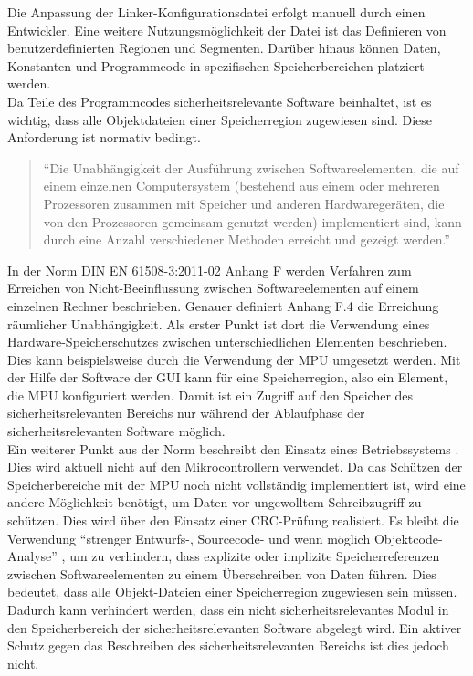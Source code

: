 Die Anpassung der Linker-Konfigurationsdatei erfolgt manuell durch einen Entwickler.
Eine weitere Nutzungsmöglichkeit der Datei ist das Definieren von benutzerdefinierten Regionen und Segmenten.
Darüber hinaus können Daten, Konstanten und Programmcode in spezifischen Speicherbereichen platziert werden. \\

Da Teile des Programmcodes sicherheitsrelevante Software beinhaltet, ist es wichtig, dass alle Objektdateien einer Speicherregion zugewiesen sind.
Diese Anforderung ist normativ bedingt.
\begin{quote}
	\enquote{Die Unabhängigkeit der Ausführung zwischen Softwareelementen, die auf einem einzelnen Computersystem (bestehend aus einem oder mehreren Prozessoren zusammen mit Speicher und anderen Hardwaregeräten, die von den Prozessoren gemeinsam genutzt werden) implementiert sind, kann durch eine Anzahl verschiedener Methoden erreicht und gezeigt werden.} \cite{FunkSicher}
\end{quote}
In der Norm DIN EN 61508-3:2011-02 Anhang F werden Verfahren zum Erreichen von Nicht-Beeinflussung zwischen Softwareelementen auf einem einzelnen Rechner beschrieben.
Genauer definiert Anhang F.4 die Erreichung räumlicher Unabhängigkeit.
Als erster Punkt ist dort die Verwendung eines Hardware-Speicherschutzes zwischen unterschiedlichen Elementen beschrieben.
Dies kann beispielsweise durch die Verwendung der \ac{MPU} umgesetzt werden.
Mit der Hilfe der Software der \ac{GUI} kann für eine Speicherregion, also ein Element, die \ac{MPU} konfiguriert werden.
Damit ist ein Zugriff auf den Speicher des sicherheitsrelevanten Bereichs nur während der Ablaufphase der sicherheitsrelevanten Software möglich. \\

Ein weiterer Punkt aus der Norm beschreibt den Einsatz eines Betriebssystems \cite{FunkSicher}.
Dies wird aktuell nicht auf den Mikrocontrollern verwendet.
Da das Schützen der Speicherbereiche mit der \ac{MPU} noch nicht vollständig implementiert ist, wird eine andere Möglichkeit benötigt, um Daten vor ungewolltem Schreibzugriff zu schützen. 
Dies wird über den Einsatz einer \ac{CRC}-Prüfung realisiert.
Es bleibt die Verwendung \enquote{strenger Entwurfs-, Sourcecode- und wenn möglich Objektcode-Analyse} \cite{FunkSicher}, um zu verhindern, dass explizite oder implizite Speicherreferenzen zwischen Softwareelementen zu einem Überschreiben von Daten führen. 
Dies bedeutet, dass alle Objekt-Dateien einer Speicherregion zugewiesen sein müssen.
Dadurch kann verhindert werden, dass ein nicht sicherheitsrelevantes Modul in den Speicherbereich der sicherheitsrelevanten Software abgelegt wird. 
Ein aktiver Schutz gegen das Beschreiben des sicherheitsrelevanten Bereichs ist dies jedoch nicht. \\

